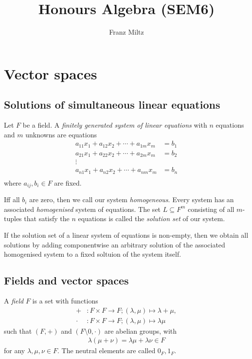 \documentclass{article}
\begin{document}
\mkthmstwounified
\title{Honours Algebra (SEM6)}
\author{Franz Miltz}
\maketitle
\tableofcontents
\pagebreak

\section{Vector spaces}

\subsection{Solutions of simultaneous linear equations}

\begin{definition}
	Let $F$ be a field. A \emph{finitely generated system of linear equations} with $n$ equations and
	$m$ unknowns are equations
	\begin{align*}
		a_{11}x_1 + a_{12}x_2 + \cdots + a_{1m}x_m & = b_1 \\
		a_{21}x_1 + a_{22}x_2 + \cdots + a_{2m}x_m & = b_2 \\
		\vdots                                             \\
		a_{n1}x_1 + a_{n2}x_2 + \cdots + a_{nm}x_m & = b_n \\
	\end{align*}
	where $a_{ij},b_i\in F$ are fixed.

	Iff all $b_i$ are zero, then we call our system \emph{homogeneous}. Every system
	has an associated \emph{homogenised} system of equations.
	The set $L\subseteq F^m$ consisting of all $m$-tuples that satisfy the
	$n$ equations is called the \emph{solution set} of our system.
\end{definition}

\begin{theorem}[Theorem 1.1.4]
	If the solution set of a linear system of equations is non-empty, then we obtain
	all solutions by adding componentwise an arbitrary solution of the associated
	homogenised system to a fixed soltuion of the system itself.
\end{theorem}

\subsection{Fields and vector spaces}

\begin{definition}
	A \emph{field} $F$ is a set with functions
	\begin{align*}
		+     & : F\times F \to F ; (\lambda,\mu) \mapsto \lambda + \mu, \\
		\cdot & : F\times F \to F ; (\lambda,\mu) \mapsto \lambda \mu
	\end{align*}
	such that $(F,+)$ and $(F\setminus{0},\cdot)$ are abelian groups, with
	\begin{align*}
		\lambda(\mu + \nu) = \lambda \mu + \lambda \nu \in F
	\end{align*}
	for any $\lambda,\mu,\nu\in F$. The neutral elements are called $0_F,1_F$.
\end{definition}
\end{document}
